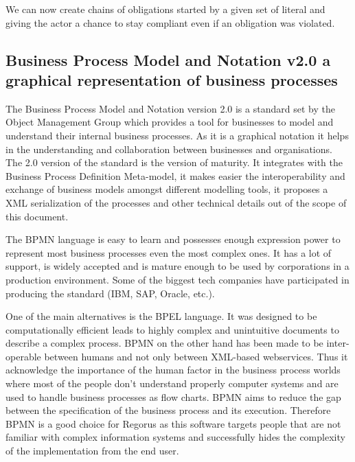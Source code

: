 \documentclass[10pt]{report}
\begin{document}
We can now create chains of obligations started by a given set of literal and giving the actor a chance to stay compliant even if an obligation was violated. \autocite{NormComplianceinBPModeling}

\subsection{Business Process Model and Notation v2.0 a graphical representation of business processes}

The Business Process Model and Notation version 2.0 is a standard set by the Object Management Group which provides a tool for businesses to model and understand their internal business processes. As it is a graphical notation it helps in the understanding and collaboration between businesses and organisations. \autocite{BPMNWebsite} The 2.0 version of the standard is the version of maturity. It integrates with the Business Process Definition Meta-model, it makes easier the interoperability and exchange of business models amongst different modelling tools, it proposes a XML serialization of the processes and other technical details out of the scope of this document. \autocite{BPMNstandardDocument}

The BPMN language is easy to learn and possesses enough expression power to represent most business processes even the most complex ones. It has a lot of support, is widely accepted and is mature enough to be used by corporations in a production environment. \autocite{powerpointGagne2012} Some of the biggest tech companies have participated in producing the standard (IBM, SAP, Oracle, etc.). \autocite{BPMNexample}

One of the main alternatives is the BPEL language. It was designed to be computationally efficient leads to highly complex and unintuitive documents to describe a complex process. BPMN on the other hand has been made to be inter-operable between humans and not only between XML-based webservices. Thus it acknowledge the importance of the human factor in the business process worlds where most of the people don't understand properly computer systems and are used to handle business processes as flow charts. BPMN aims to reduce the gap between the specification of the business process and its execution. Therefore BPMN is a good choice for Regorus as this software targets people that are not familiar with complex information systems and successfully hides the complexity of the implementation from the end user. \autocite{BPMNstandardDocument}
\end{document}
